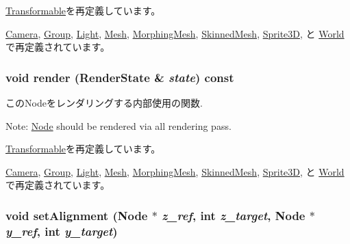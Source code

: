\hyperlink{classm3g_1_1Transformable_6fea17fa1532df3794f8cb39cb4f911f}{Transformable}を再定義しています。

\hyperlink{classm3g_1_1Camera_6fea17fa1532df3794f8cb39cb4f911f}{Camera}, \hyperlink{classm3g_1_1Group_6fea17fa1532df3794f8cb39cb4f911f}{Group}, \hyperlink{classm3g_1_1Light_6fea17fa1532df3794f8cb39cb4f911f}{Light}, \hyperlink{classm3g_1_1Mesh_6fea17fa1532df3794f8cb39cb4f911f}{Mesh}, \hyperlink{classm3g_1_1MorphingMesh_6fea17fa1532df3794f8cb39cb4f911f}{MorphingMesh}, \hyperlink{classm3g_1_1SkinnedMesh_6fea17fa1532df3794f8cb39cb4f911f}{SkinnedMesh}, \hyperlink{classm3g_1_1Sprite3D_6fea17fa1532df3794f8cb39cb4f911f}{Sprite3D}, と \hyperlink{classm3g_1_1World_6fea17fa1532df3794f8cb39cb4f911f}{World}で再定義されています。\hypertarget{classm3g_1_1Node_8babc8a79b78615da51161e94029eea9}{
\subsubsection[{render}]{\setlength{\rightskip}{0pt plus 5cm}void render ({\bf RenderState} \& {\em state}) const}}
\label{classm3g_1_1Node_8babc8a79b78615da51161e94029eea9}


このNodeをレンダリングする内部使用の関数.

Note: \hyperlink{classm3g_1_1Node}{Node} should be rendered via all rendering pass. 

\hyperlink{classm3g_1_1Transformable_8babc8a79b78615da51161e94029eea9}{Transformable}を再定義しています。

\hyperlink{classm3g_1_1Camera_8babc8a79b78615da51161e94029eea9}{Camera}, \hyperlink{classm3g_1_1Group_8babc8a79b78615da51161e94029eea9}{Group}, \hyperlink{classm3g_1_1Light_8babc8a79b78615da51161e94029eea9}{Light}, \hyperlink{classm3g_1_1Mesh_8babc8a79b78615da51161e94029eea9}{Mesh}, \hyperlink{classm3g_1_1MorphingMesh_8babc8a79b78615da51161e94029eea9}{MorphingMesh}, \hyperlink{classm3g_1_1SkinnedMesh_8babc8a79b78615da51161e94029eea9}{SkinnedMesh}, \hyperlink{classm3g_1_1Sprite3D_8babc8a79b78615da51161e94029eea9}{Sprite3D}, と \hyperlink{classm3g_1_1World_8babc8a79b78615da51161e94029eea9}{World}で再定義されています。\hypertarget{classm3g_1_1Node_dd1627aba90e63c166ecd3d7463d735a}{
\subsubsection[{setAlignment}]{\setlength{\rightskip}{0pt plus 5cm}void setAlignment ({\bf Node} $\ast$ {\em z\_\-ref}, \/  int {\em z\_\-target}, \/  {\bf Node} $\ast$ {\em y\_\-ref}, \/  int {\em y\_\-target})}}
\label{classm3g_1_1Node_dd1627aba90e63c166ecd3d7463d735a}


